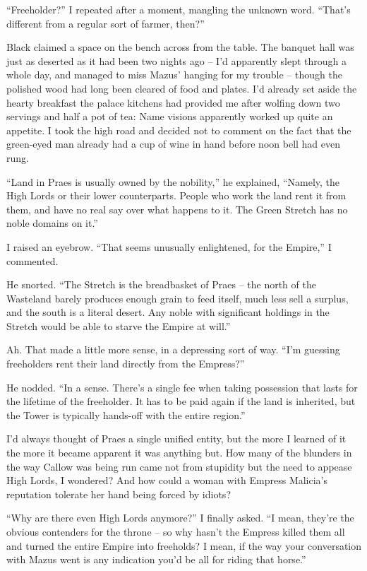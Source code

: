 \documentclass[12pt, openany]{book}
\begin{document}
“Freeholder?” I repeated after a moment, mangling the unknown word. “That’s different from a regular sort of farmer, then?”

Black claimed a space on the bench across from the table. The banquet hall was just as deserted as it had been two nights ago – I’d apparently slept through a whole day, and managed to miss Mazus’ hanging for my trouble – though the polished wood had long been cleared of food and plates. I’d already set aside the hearty breakfast the palace kitchens had provided me after wolfing down two servings and half a pot of tea: Name visions apparently worked up quite an appetite. I took the high road and decided not to comment on the fact that the green-eyed man already had a cup of wine in hand before noon bell had even rung.

“Land in Praes is usually owned by the nobility,” he explained, “Namely, the High Lords or their lower counterparts. People who work the land rent it from them, and have no real say over what happens to it. The Green Stretch has no noble domains on it.”

I raised an eyebrow. “That seems unusually enlightened, for the Empire,” I commented.

He snorted. “The Stretch is the breadbasket of Praes – the north of the Wasteland barely produces enough grain to feed itself, much less sell a surplus, and the south is a literal desert. Any noble with significant holdings in the Stretch would be able to starve the Empire at will.”

Ah. That made a little more sense, in a depressing sort of way. “I’m guessing freeholders rent their land directly from the Empress?”

He nodded. “In a sense. There’s a single fee when taking possession that lasts for the lifetime of the freeholder. It has to be paid again if the land is inherited, but the Tower is typically hands-off with the entire region.”

I’d always thought of Praes a single unified entity, but the more I learned of it the more it became apparent it was anything but. How many of the blunders in the way Callow was being run came not from stupidity but the need to appease High Lords, I wondered? And how could a woman with Empress Malicia’s reputation tolerate her hand being forced by idiots?

“Why are there even High Lords anymore?” I finally asked. “I mean, they’re the obvious contenders for the throne – so why hasn’t the Empress killed them all and turned the entire Empire into freeholds? I mean, if the way your conversation with Mazus went is any indication you’d be all for riding that horse.”
\end{document}
